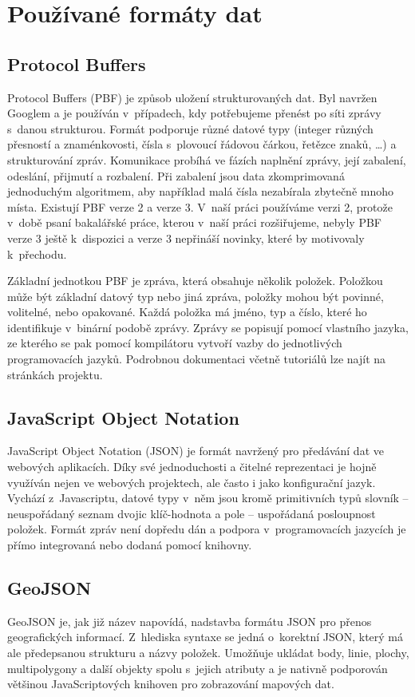 \section{Používané formáty dat}

\subsection{Protocol Buffers}
Protocol Buffers (PBF) \cite{PBF} je způsob uložení strukturovaných dat. Byl navržen
Googlem a je používán v~případech, kdy potřebujeme přenést po síti zprávy
s~danou strukturou. Formát podporuje různé datové typy (integer různých přesností
a znaménkovosti, čísla s~plovoucí řádovou čárkou, řetězce znaků, \dots) a
strukturování zpráv. Komunikace probíhá ve fázích naplnění zprávy, její
zabalení, odeslání, přijmutí a rozbalení. Při zabalení jsou data zkomprimovaná
jednoduchým algoritmem, aby například malá čísla nezabírala zbytečně mnoho
místa. Existují PBF verze 2 a verze 3. V~naší práci používáme verzi 2, protože
v~době psaní bakalářské práce, kterou v~naší práci rozšiřujeme, nebyly PBF verze 3
ještě k~dispozici a verze 3 nepřináší novinky, které by motivovaly k~přechodu.

Základní jednotkou PBF je zpráva, která obsahuje několik položek. Položkou může
být základní datový typ nebo jiná zpráva, položky mohou být povinné, volitelné,
nebo opakované. Každá položka má jméno, typ a číslo, které ho identifikuje
v~binární podobě zprávy. Zprávy se popisují pomocí vlastního jazyka, ze kterého se
pak pomocí kompilátoru vytvoří vazby do jednotlivých programovacích jazyků. 
Podrobnou dokumentaci včetně tutoriálů lze najít na stránkách projektu. \cite{PBF}

\subsection{JavaScript Object Notation}
JavaScript Object Notation \cite{JSON} (JSON) je formát navržený pro předávání dat ve
webových aplikacích. Díky své jednoduchosti a čitelné reprezentaci je hojně
využíván nejen ve webových projektech, ale často i jako konfigurační jazyk.
Vychází z~Javascriptu, datové typy v~něm jsou kromě primitivních typů slovník --
neuspořádaný seznam dvojic klíč-hodnota a pole -- uspořádaná posloupnost
položek. Formát zpráv není dopředu dán a podpora v~programovacích jazycích je
přímo integrovaná nebo dodaná pomocí knihovny. 

\subsection{GeoJSON}
GeoJSON \cite{GeoJSON} je, jak již název napovídá, nadstavba formátu JSON pro přenos
geografických informací. Z~hlediska syntaxe se jedná o~korektní JSON, který má
ale předepsanou strukturu a názvy položek. Umožňuje ukládat body, linie, plochy,
multipolygony a další objekty spolu s~jejich atributy a je nativně podporován
většinou JavaScriptových knihoven pro zobrazování mapových dat.


